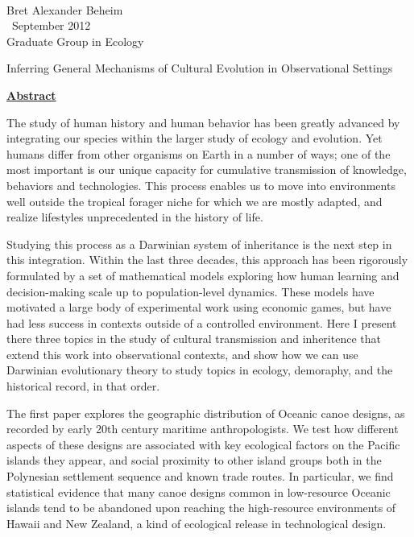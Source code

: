 \documentclass[letterpaper, 12pt, oneside]{book}
\begin{document}
     
	 
	 \thispagestyle{empty}
	 
	 \doublespacing

    ~\vspace{-1in} %
    \begin{flushright}
		\singlespacing
        Bret Alexander Beheim\\
        ~September 2012\\
        Graduate Group in Ecology
    \end{flushright}

    \centerline{\large Inferring General Mechanisms of Cultural Evolution in Observational Settings}
    
    \centerline{\textbf{\underline{Abstract}}}
 

    
        The study of human history and human behavior has been greatly advanced by integrating our species within the larger study of ecology and evolution.  Yet humans differ from other organisms on Earth in a number of ways; one of the most important is our unique capacity for cumulative transmission of knowledge, behaviors and technologies. This process enables us to move into environments well outside the tropical forager niche for which we are mostly adapted, and realize lifestyles unprecedented in the history of life.  

Studying this process as a Darwinian system of inheritance is the next step in this integration.  Within the last three decades, this approach has been rigorously formulated by a set of mathematical models exploring how human learning and decision-making scale up to population-level dynamics.  These models have motivated a large body of experimental work using economic games, but have had less success in contexts outside of a controlled environment.  Here I present there three topics in the study of cultural transmission and inheritence that extend this work into observational contexts, and show how we can use Darwinian evolutionary theory to study topics in ecology, demoraphy, and the historical record, in that order.  

The first paper explores the geographic distribution of Oceanic canoe designs, as recorded by early 20th century maritime anthropologists.  We test how different aspects of these designs are associated with key ecological factors on the Pacific islands they appear, and social proximity to other island groups both in the Polynesian settlement sequence and known trade routes.  In particular, we find statistical evidence that many canoe designs common in low-resource Oceanic islands tend to be abandoned upon reaching the high-resource environments of Hawaii and New Zealand, a kind of ecological release in technological design.  
\end{document}

